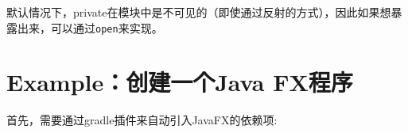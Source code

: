 \documentclass[12pt]{article}
\begin{document}
\begin{Shaded}
\begin{Highlighting}[]
 \OperatorTok{\{}
\OperatorTok{;}
\OperatorTok{\}}

 \OperatorTok{\{}
\OperatorTok{;}
\OperatorTok{\}}
\end{Highlighting}
\end{Shaded}

默认情况下，private在模块中是不可见的（即使通过反射的方式），因此如果想暴露出来，可以通过\texttt{open}来实现。

\begin{Shaded}
\begin{Highlighting}[]
\OperatorTok{\{}
\OperatorTok{;}
\OperatorTok{\}}

 \OperatorTok{\{}
\OperatorTok{,}\OperatorTok{,}
\OperatorTok{\}}

\OperatorTok{\{}
\OperatorTok{\}}
\end{Highlighting}
\end{Shaded}

\section{Example：创建一个Java FX程序}\label{exampleux521bux5efaux4e00ux4e2ajava-fxux7a0bux5e8f}

首先，需要通过gradle插件来自动引入JavaFX的依赖项:

\begin{Shaded}
\begin{Highlighting}[]
\OperatorTok{\{}
\OperatorTok{\}}

\OperatorTok{\{}
\OperatorTok{=} 
\OperatorTok{=} \OperatorTok{[}  \OperatorTok{]}
\OperatorTok{\}}
\end{Highlighting}
\end{Shaded}
\end{document}
